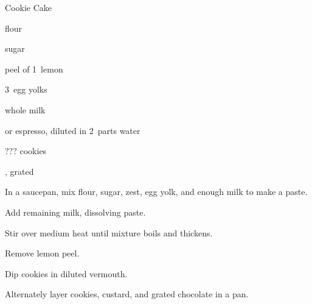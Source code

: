 \begin{recipe}{Cookie Cake\FIXME}{}{}

\begin{ingredients}
\item {} flour
\item \C{\half} sugar
\item peel of 1~lemon
\item 3~egg yolks
\item {} whole milk
\item {} or espresso, diluted in 2~parts water
\item ??? cookies
\item {}, grated
\end{ingredients}

\begin{directions}
\item In a saucepan, mix flour, sugar, zest, egg yolk, and enough milk to make a paste.
\item Add remaining milk, dissolving paste.
\item Stir over medium heat until mixture boils and thickens.
\item Remove lemon peel.
\item Dip cookies in diluted vermouth.
\item Alternately layer cookies, custard, and grated chocolate in a pan.
\end{directions}

\end{recipe}
